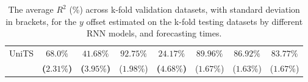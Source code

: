 \begin{table}[!ht]
{\begin{tabular}{|c|c|c|c|c|c|c|c|}
			\multirow{2}{*}{UniTS} & $\mathbf{68.0\%}$ & $\mathbf{41.68\%}$ & $92.75\%$ & $\mathbf{24.17\%}$ & $89.96\%$ & $86.92\%$ & $83.77\%$ \\
			 & \textbf{(}$\mathbf{2.31\%}$\textbf{)} & \textbf{(}$\mathbf{3.95\%}$\textbf{)} & ($1.98\%$) & \textbf{(}$\mathbf{4.68\%}$\textbf{)} & ($1.67\%$) & ($1.63\%$) & ($1.67\%$) \\ \hline
		\end{tabular}
	}
	\caption{The average $R^{2}$ (\%) across k-fold validation datasets, with standard deviation in brackets, for the $y$ offset estimated on the k-fold testing datasets by different RNN models, and forecasting times.}
	\label{tab:all_latitude_no_abs_R2}
\end{table}